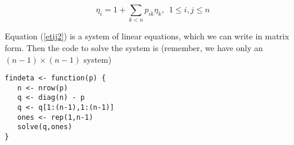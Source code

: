 \begin{equation}
\label{etij2}
\eta_{i}
= 1 + \sum_{k < n} p_{ik} \eta_k, ~~
1 \leq i,j \leq n
\end{equation}

Equation (\ref{etij2}) is a system of linear equations, which we can
write in matrix form.  Then the code to solve the system is
(remember, we have only an $(n-1) \times (n-1)$ system)

\begin{lstlisting}                                                              
findeta <- function(p) {                                                        
   n <- nrow(p)                                                                 
   q <- diag(n) - p                                                             
   q <- q[1:(n-1),1:(n-1)]                                                      
   ones <- rep(1,n-1)                                                           
   solve(q,ones)                                                                
}                                                                               
\end{lstlisting}                        

